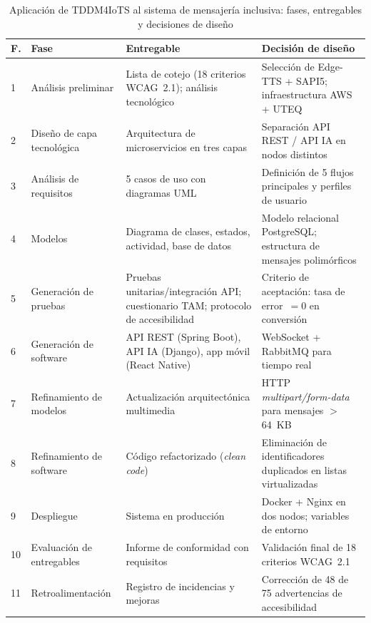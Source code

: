 \documentclass[journal]{IEEEtran}
\begin{document}
				\begin{table}[!t]
					\caption{Aplicaci\'on de TDDM4IoTS al sistema de mensajer\'ia inclusiva: fases, entregables y decisiones de dise\~no}
					\label{tab:fases_tddm4iots}
					\centering
					\scriptsize
					\renewcommand{\arraystretch}{1.25}
					\begin{tabular}{p{0.25cm}p{1.9cm}p{2.5cm}p{2.1cm}}
						\toprule
						\textbf{F.} & \textbf{Fase} & \textbf{Entregable} & \textbf{Decisi\'on de dise\~no} \\
						\midrule
						1 & An\'alisis preliminar & Lista de cotejo (18 criterios WCAG~2.1); an\'alisis tecnol\'ogico & Selecci\'on de Edge-TTS + SAPI5; infraestructura AWS + UTEQ \\
						2 & Dise\~no de capa tecnol\'ogica & Arquitectura de microservicios en tres capas & Separaci\'on API REST / API IA en nodos distintos \\
						3 & An\'alisis de requisitos & 5 casos de uso con diagramas UML & Definici\'on de 5 flujos principales y perfiles de usuario \\
						4 & Modelos & Diagrama de clases, estados, actividad, base de datos & Modelo relacional PostgreSQL; estructura de mensajes polim\'orficos \\
						5 & Generaci\'on de pruebas & Pruebas unitarias/integraci\'on API; cuestionario TAM; protocolo de accesibilidad & Criterio de aceptaci\'on: tasa de error~$= 0$ en conversi\'on \\
						6 & Generaci\'on de software & API REST (Spring Boot), API IA (Django), app m\'ovil (React Native) & WebSocket + RabbitMQ para tiempo real \\
						7 & Refinamiento de modelos & Actualizaci\'on arquitect\'onica multimedia & HTTP \textit{multipart/form-data} para mensajes $>$64~KB \\
						8 & Refinamiento de software & C\'odigo refactorizado (\textit{clean code}) & Eliminaci\'on de identificadores duplicados en listas virtualizadas \\
						9 & Despliegue & Sistema en producci\'on & Docker + Nginx en dos nodos; variables de entorno \\
						10 & Evaluaci\'on de entregables & Informe de conformidad con requisitos & Validaci\'on final de 18 criterios WCAG~2.1 \\
						11 & Retroalimentaci\'on & Registro de incidencias y mejoras & Correcci\'on de 48 de 75 advertencias de accesibilidad \\
						\bottomrule
					\end{tabular}
				\end{table}
				
\end{document}
